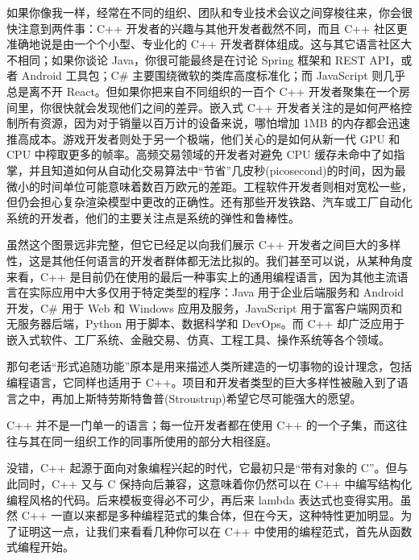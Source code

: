 如果你像我一样，经常在不同的组织、团队和专业技术会议之间穿梭往来，你会很快注意到两件事：C++ 开发者的兴趣与其他开发者截然不同，而且 C++ 社区更准确地说是由一个个小型、专业化的 C++ 开发者群体组成。这与其它语言社区大不相同；如果你谈论 Java，你很可能最终是在讨论 Spring 框架和 REST API，或者 Android 工具包；C\# 主要围绕微软的类库高度标准化；而 JavaScript 则几乎总是离不开 React。但如果你把来自不同组织的一百个 C++ 开发者聚集在一个房间里，你很快就会发现他们之间的差异。嵌入式 C++ 开发者关注的是如何严格控制所有资源，因为对于销量以百万计的设备来说，哪怕增加 1MB 的内存都会迅速推高成本。游戏开发者则处于另一个极端，他们关心的是如何从新一代 GPU 和 CPU 中榨取更多的帧率。高频交易领域的开发者对避免 CPU 缓存未命中了如指掌，并且知道如何从自动化交易算法中“节省”几皮秒(picosecond)的时间，因为最微小的时间单位可能意味着数百万欧元的差距。工程软件开发者则相对宽松一些，但仍会担心复杂渲染模型中更改的正确性。还有那些开发铁路、汽车或工厂自动化系统的开发者，他们的主要关注点是系统的弹性和鲁棒性。

虽然这个图景远非完整，但它已经足以向我们展示 C++ 开发者之间巨大的多样性，这是其他任何语言的开发者群体都无法比拟的。我们甚至可以说，从某种角度来看，C++ 是目前仍在使用的最后一种事实上的通用编程语言，因为其他主流语言在实际应用中大多仅用于特定类型的程序：Java 用于企业后端服务和 Android 开发，C\# 用于 Web 和 Windows 应用及服务，JavaScript 用于富客户端网页和无服务器后端，Python 用于脚本、数据科学和 DevOps。而 C++ 却广泛应用于嵌入式软件、工厂系统、金融交易、仿真、工程工具、操作系统等各个领域。

那句老话“形式追随功能”原本是用来描述人类所建造的一切事物的设计理念，包括编程语言，它同样也适用于 C++。项目和开发者类型的巨大多样性被融入到了语言之中，再加上斯特劳斯特鲁普(Stroustrup)希望它尽可能强大的愿望。

C++ 并不是一门单一的语言；每一位开发者都在使用 C++ 的一个子集，而这往往与其在同一组织工作的同事所使用的部分大相径庭。

没错，C++ 起源于面向对象编程兴起的时代，它最初只是“带有对象的 C”。但与此同时，C++ 又与 C 保持向后兼容，这意味着你仍然可以在 C++ 中编写结构化编程风格的代码。后来模板变得必不可少，再后来 lambda 表达式也变得实用。虽然 C++ 一直以来都是多种编程范式的集合体，但在今天，这种特性更加明显。为了证明这一点，让我们来看看几种你可以在 C++ 中使用的编程范式，首先从函数式编程开始。